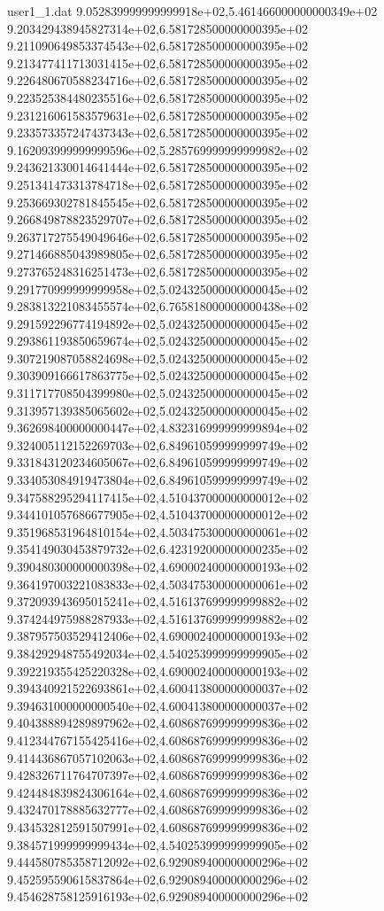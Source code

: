 \begin{filecontents}{user1_1.dat}
9.052839999999999918e+02,5.461466000000000349e+02
9.203429438945827314e+02,6.581728500000000395e+02
9.211090649853374543e+02,6.581728500000000395e+02
9.213477411713031415e+02,6.581728500000000395e+02
9.226480670588234716e+02,6.581728500000000395e+02
9.223525384480235516e+02,6.581728500000000395e+02
9.231216061583579631e+02,6.581728500000000395e+02
9.233573357247437343e+02,6.581728500000000395e+02
9.162093999999999596e+02,5.285769999999999982e+02
9.243621330014641444e+02,6.581728500000000395e+02
9.251341473313784718e+02,6.581728500000000395e+02
9.253669302781845545e+02,6.581728500000000395e+02
9.266849878823529707e+02,6.581728500000000395e+02
9.263717275549049646e+02,6.581728500000000395e+02
9.271466885043989805e+02,6.581728500000000395e+02
9.273765248316251473e+02,6.581728500000000395e+02
9.291770999999999958e+02,5.024325000000000045e+02
9.283813221083455574e+02,6.765818000000000438e+02
9.291592296774194892e+02,5.024325000000000045e+02
9.293861193850659674e+02,5.024325000000000045e+02
9.307219087058824698e+02,5.024325000000000045e+02
9.303909166617863775e+02,5.024325000000000045e+02
9.311717708504399980e+02,5.024325000000000045e+02
9.313957139385065602e+02,5.024325000000000045e+02
9.362698400000000447e+02,4.832316999999999894e+02
9.324005112152269703e+02,6.849610599999999749e+02
9.331843120234605067e+02,6.849610599999999749e+02
9.334053084919473804e+02,6.849610599999999749e+02
9.347588295294117415e+02,4.510437000000000012e+02
9.344101057686677905e+02,4.510437000000000012e+02
9.351968531964810154e+02,4.503475300000000061e+02
9.354149030453879732e+02,6.423192000000000235e+02
9.390480300000000398e+02,4.690002400000000193e+02
9.364197003221083833e+02,4.503475300000000061e+02
9.372093943695015241e+02,4.516137699999999882e+02
9.374244975988287933e+02,4.516137699999999882e+02
9.387957503529412406e+02,4.690002400000000193e+02
9.384292948755492034e+02,4.540253999999999905e+02
9.392219355425220328e+02,4.690002400000000193e+02
9.394340921522693861e+02,4.600413800000000037e+02
9.394631000000000540e+02,4.600413800000000037e+02
9.404388894289897962e+02,4.608687699999999836e+02
9.412344767155425416e+02,4.608687699999999836e+02
9.414436867057102063e+02,4.608687699999999836e+02
9.428326711764707397e+02,4.608687699999999836e+02
9.424484839824306164e+02,4.608687699999999836e+02
9.432470178885632777e+02,4.608687699999999836e+02
9.434532812591507991e+02,4.608687699999999836e+02
9.384571999999999434e+02,4.540253999999999905e+02
9.444580785358712092e+02,6.929089400000000296e+02
9.452595590615837864e+02,6.929089400000000296e+02
9.454628758125916193e+02,6.929089400000000296e+02

\end{filecontents}
